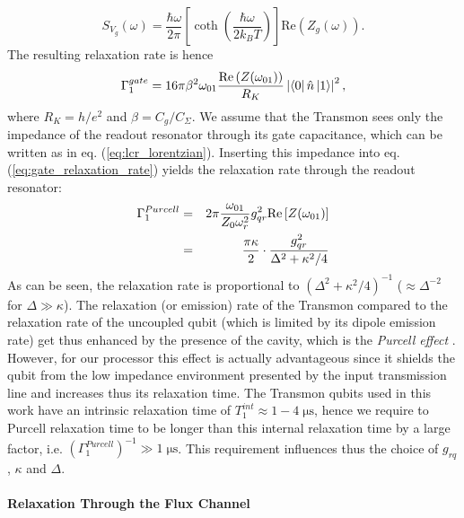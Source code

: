 %
\begin{equation}
S_{V_g}(\omega) = \frac{\hbar\omega}{2\pi}\left[\coth{\left(\frac{\hbar \omega}{2 k_B T}\right)}\right]\mathrm{Re}\left(Z_g(\omega)\right).
\end{equation}
%
The resulting relaxation rate is hence
%
\begin{equation}
\Gamma_1^{gate} = 16\pi\beta^2 \omega_{01} \frac{\mathrm{Re}\left(Z(\omega_{01})\right)}{R_K}\left|\left< 0 \right|\hat{n}\left| 1 \right>\right|^2, \label{eq:gate_relaxation_rate}
\end{equation}
%
where $R_K = h/e^2$ and $\beta=C_g/C_\Sigma$. We assume that the Transmon sees only the impedance of the readout resonator through its gate capacitance, which can be written as in eq. (\ref{eq:lcr_lorentzian}). Inserting this impedance into eq. (\ref{eq:gate_relaxation_rate}) yields the relaxation rate through the readout resonator:
%
\begin{eqnarray}
\Gamma_1^{Purcell} & = & 2\pi\frac{\omega_{01}}{Z_0 \omega_r^2}g_{qr}^2 \mathrm{Re}\left[Z(\omega_{01})\right] \notag \\
                & = & \frac{\pi\kappa}{2}\cdot\frac{g_{qr}^2}{\Delta^2+\kappa^2/4} \label{eq:purcell_rate}
\end{eqnarray}
%
As can be seen, the relaxation rate is proportional to $(\Delta^2+\kappa^2/4)^{-1}$ ($\approx\Delta^{-2}$ for $\Delta \gg \kappa$). The relaxation (or emission) rate of the Transmon compared to the relaxation rate of the uncoupled qubit (which is limited by its dipole emission rate) get thus enhanced by the presence of the cavity, which is the {\it Purcell effect} \citep{purcell_spontaneous_1946}. However, for our processor this effect is actually advantageous since it shields the qubit from the low impedance environment presented by the input transmission line and increases thus its relaxation time. The Transmon qubits used in this work have an intrinsic relaxation time of $T_1^{int}\approx 1-4 \; \mathrm{\mu s}$, hence we require to Purcell relaxation time to be longer than this internal relaxation time by a large factor, i.e. $(\Gamma_1^{Purcell})^{-1}\gg 1\;\mathrm{\mu s}$. This requirement influences thus the choice of $g_{rq}$, $\kappa$ and $\Delta$.
 
\paragraph{Relaxation Through the Flux Channel}

